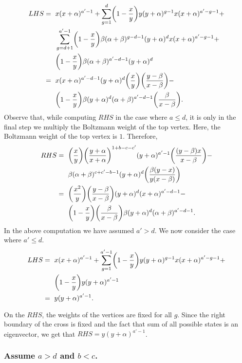 \documentclass[ALCO, Unicode]{cedram}
\DeclarePairedDelimiter\autobracket{(}{)}
\newcommand{\br}[1]{\autobracket*{#1}}
\begin{document}
{\allowdisplaybreaks
\begin{align*}
LHS=\text{ }& x(x+\alpha)^{a'-1}+\sum^{d}_{g=1} \br{1-\dfrac{x}{y}} y(y+\alpha)^{g-1}x(x+\alpha)^{a'-g-1}+\\
            &\sum^{a'-1}_{g=d+1}\br{1-\dfrac{x}{y}}\beta(\alpha+\beta)^{g-d-1}(y+\alpha)^{d}x(x+\alpha)^{a'-g-1}+\\
            &\br{1-\dfrac{x}{y}}\beta(\alpha+\beta)^{a'-d-1}(y+\alpha)^{d}\\
            =\text{ }& x(x+\alpha)^{a'-d-1}(y+\alpha)^{d}\br{\dfrac{x}{y}}\br{\dfrac{y-\beta}{x-\beta}}-\\
            &\br{1-\dfrac{x}{y}}\beta (y+\alpha)^{d}(\alpha+\beta)^{a'-d-1}\br{\dfrac{\beta}{x-\beta}}.
\end{align*}
}
 Observe that, while computing $RHS$ in the case where $a\leq d$, it is only in the final step we multiply the Boltzmann weight of the top vertex. 
 Here, the Boltzmann weight of the top vertex is $1$. Therefore,
{\allowdisplaybreaks
\begin{align*}
RHS=\text{ }&  \br{\dfrac{x}{y}}\br{\dfrac{y+\alpha}{x+\alpha}}^{1+b-c-c'}(y+\alpha)^{a'-1}\br{\dfrac{(y-\beta)x}{x-\beta}}-\\
           & \beta(\alpha+\beta)^{c+c'-b-1}(y+\alpha)^{d}\br{\dfrac{\beta(y-x)}{y(x-\beta)}}\\
           =\text{ }& \br{\dfrac{x^2}{y}}\br{\dfrac{y-\beta}{x-\beta}}(y+\alpha)^{d}(x+\alpha)^{a'-d-1}-\\
           & \br{1-\dfrac{x}{y}}\br{\dfrac{\beta}{x-\beta}}\beta(y+\alpha)^{d}(\alpha+\beta)^{a'-d-1}.
\end{align*}
}
In the above computation we have assumed $a'>d$. We now consider the case where $a'\leq d$.
{\allowdisplaybreaks
\begin{align*}
LHS=\text{ }& x(x+\alpha)^{a'-1}+\sum^{a'-1}_{g=1} \br{1-\dfrac{x}{y}} y(y+\alpha)^{g-1}x(x+\alpha)^{a'-g-1}+\\
            &\br{1-\dfrac{x}{y}}y(y+\alpha)^{a'-1}\\
            =\text{ }&y(y+\alpha)^{a'-1}.
\end{align*}
}

On the $RHS$, the weights of the vertices are fixed for all $g$. Since the right boundary of the cross is fixed and the fact that sum of all possible states is an eigenvector, we get that $RHS=y(y+\alpha)^{a'-1}$.


\subsubsection{Assume \texorpdfstring{$a>d$ and $b<c$}{a>d and b<c}.}
\end{document}
